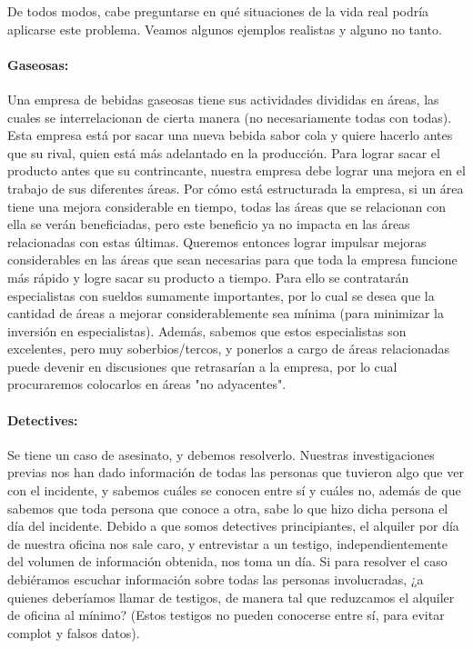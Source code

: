 \documentclass[a4paper]{article}
\begin{document}
\vspace*{0.3cm}

De todos modos, cabe preguntarse en qué situaciones de la vida real podría aplicarse este problema. Veamos algunos ejemplos realistas y alguno no tanto.


\paragraph{Gaseosas:} Una empresa de bebidas gaseosas tiene sus actividades divididas en áreas, las cuales se interrelacionan de cierta manera (no necesariamente todas con todas).  Esta empresa está por sacar una nueva bebida sabor cola y quiere hacerlo antes que su rival, quien está más adelantado en la producción.  Para lograr sacar el producto antes que su contrincante, nuestra empresa debe lograr una mejora en el trabajo de sus diferentes áreas.  Por cómo está estructurada la empresa, si un área tiene una mejora considerable en tiempo, todas las áreas que se relacionan con ella se verán beneficiadas, pero este beneficio ya no impacta en las áreas relacionadas con estas últimas.  Queremos entonces lograr impulsar mejoras considerables en las áreas que sean necesarias para que toda la empresa funcione más rápido y logre sacar su producto a tiempo.  Para ello se contratarán especialistas con sueldos sumamente importantes, por lo cual se desea que la cantidad de áreas a mejorar considerablemente sea mínima (para minimizar la inversión en especialistas).  Además, sabemos que estos especialistas son excelentes, pero muy soberbios/tercos, y ponerlos a cargo de áreas relacionadas puede devenir en discusiones que retrasarían a la empresa, por lo cual procuraremos colocarlos en áreas "no adyacentes".

\paragraph{Detectives:} Se tiene un caso de asesinato, y debemos resolverlo. Nuestras investigaciones previas nos han dado información de todas las personas que tuvieron algo que ver con el incidente, y sabemos cuáles se conocen entre sí y cuáles no, además de que sabemos que toda persona que conoce a otra, sabe lo que hizo dicha persona el día del incidente. Debido a que somos detectives principiantes, el alquiler por día de nuestra oficina nos sale caro, y entrevistar a un testigo, independientemente del volumen de información obtenida, nos toma un día. Si para resolver el caso debiéramos escuchar información sobre todas las personas involucradas, ¿a quienes deberíamos llamar de testigos, de manera tal que reduzcamos el alquiler de oficina al mínimo? (Estos testigos no pueden conocerse entre sí, para evitar complot y falsos datos).
\end{document}

